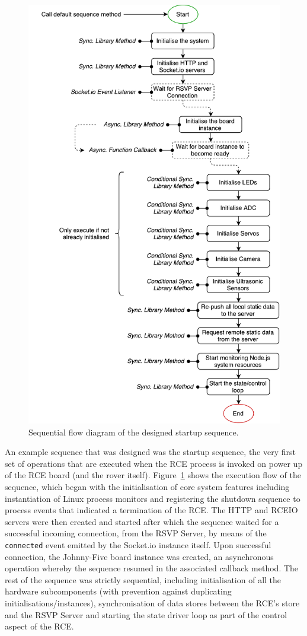           \begin{figure}[h!]
            \centering
            \includegraphics[width=0.7\linewidth]{figures/softDesign-startupSequenceFlow}
            \caption[Sequential flow diagram of the designed startup sequence.]{Sequential flow diagram of the designed startup sequence.}
            \label{fig:softDesign-startupSequenceFlow}
          \end{figure}          
          
          An example sequence that was designed was the startup sequence, the very first set of operations that are executed when the RCE process is invoked on power up of the RCE board (and the rover itself). Figure~\ref{fig:softDesign-startupSequenceFlow} shows the execution flow of the sequence, which began with the initialisation of core system features including instantiation of Linux process monitors and registering the shutdown sequence to process events that indicated a termination of the RCE. The HTTP and RCEIO servers were then created and started after which the sequence waited for a successful incoming connection, from the RSVP Server, by means of the \texttt{connected} event emitted by the Socket.io instance itself. Upon successful connection, the Johnny-Five board instance was created, an asynchronous operation whereby the sequence resumed in the associated callback method. The rest of the sequence was strictly sequential, including initialisation of all the hardware subcomponents (with prevention against duplicating initialisations/instances), synchronisation of data stores between the RCE's store and the RSVP Server and starting the state driver loop as part of the control aspect of the RCE.
                    

